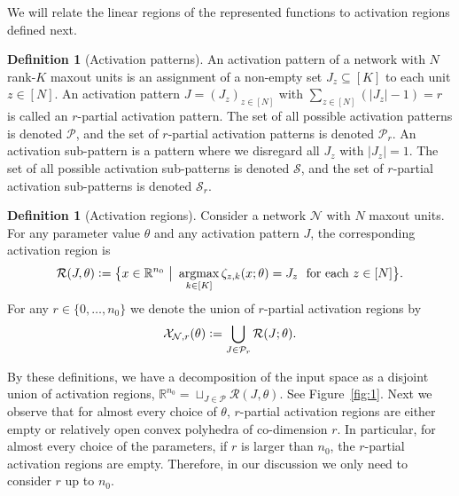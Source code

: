 \documentclass{article}
\theoremstyle{definition}
\newtheorem{definition}[theorem]{Definition}
\DeclareMathOperator*{\argmax}{argmax}
\newcommand{\defeq}{\vcentcolon=}
\newcommand{\net}{\mathcal{N}}
\newcommand{\nin}{n_0}
\begin{document}
We will relate the linear regions of the represented functions to activation regions defined next. 

\begin{definition}[Activation patterns]
An activation pattern of a network with $N$ rank-$K$ maxout units is an assignment of a non-empty set $J_z\subseteq[K]$ to each unit $z\in[N]$. 
An activation pattern $J=(J_z)_{z\in[N]}$ with $\sum_{z\in[N]} (|J_z| - 1) = r$ is called an $r$-partial activation pattern. 
The set of all possible activation patterns is denoted $\mathcal{P}$, and the set of $r$-partial activation patterns is denoted $\mathcal{P}_r$. 
An activation sub-pattern is a pattern where we disregard all $J_z$ with $|J_z|=1$. The set of all possible activation sub-patterns is denoted $\mathcal{S}$, and the set of $r$-partial activation sub-patterns is denoted $\mathcal{S}_r$. 
\end{definition}

\begin{definition}[Activation regions]
Consider a network $\net$ with $N$ maxout units. For any parameter value $\theta$ and any activation pattern $J$, the corresponding activation region is 
    \begin{align*}
        \mathcal{R}(J, \theta) \defeq \big\{ x \in \mathbb{R}^{\nin} \ \big| \ \argmax\limits_{k \in [K]} \zeta_{z, k}(x; \theta)  = J_z  \ \text{ \normalfont for each $z\in[N]$} \big\}. 
    \end{align*}
For any $r \in \{0, \dots, \nin\}$ we denote the union of $r$-partial activation regions by
     \begin{align*}
        \mathcal{X}_{\net, r}(\theta) \defeq 
        \bigcup_{J\in \mathcal{P}_r} \mathcal{R}(J; \theta). 
    \end{align*} 
\end{definition}  

By these definitions, we have a decomposition of the input space as a disjoint union of activation regions, $\mathbb{R}^{\nin} = \sqcup_{J\in \mathcal{P}} \mathcal{R}(J,\theta)$. See Figure~\ref{fig:1}. 
Next we observe that for almost every choice of $\theta$, $r$-partial activation regions are either empty or relatively open convex polyhedra of co-dimension $r$. 
%
In particular, for almost every choice of the parameters, if $r$ is larger than $n_0$, the $r$-partial activation regions are empty. Therefore, in our discussion we only need to consider $r$ up to $n_0$. 
\end{document}
